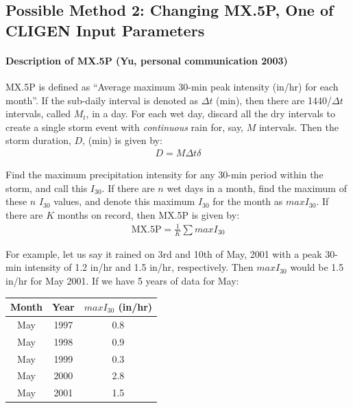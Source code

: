 \subsection{Possible Method 2: Changing {MX.5P}, One of CLIGEN Input
Parameters}
\label{sec:MethodTwo}

\paragraph{Description of {MX.5P} (Yu, personal communication 2003)}
\label{sec:MX5PByBYu}

{MX.5P} is defined as ``Average maximum 30-min peak intensity (in/hr) for each
month''. If the sub-daily interval is denoted as $\Delta t$ (min), then there
are 1440/$\Delta t$ intervals, called $M_t$, in a day. For each wet day, discard
all the dry intervals to create a single storm event with \emph{continuous} rain
for, say, $M$ intervals. Then the storm duration, $D$, (min) is given by:
\begin{eqnarray}
  D = M \Delta t \delta
\end{eqnarray}

Find the maximum precipitation intensity for any 30-min period within the storm,
and call this $I_{30}$. If there are $n$ wet days in a month, find the maximum
of these $n$ $I_{30}$ values, and denote this maximum $I_{30}$ for the month as
$maxI_{30}$. If there are $K$ months on record, then {MX.5P} is given by:
\begin{eqnarray}
  \mathrm{MX.5P} = \frac{1}{K} \sum maxI_{30}
\end{eqnarray}

For example, let us say it rained on 3rd and 10th of May, 2001 with a peak
30-min intensity of 1.2 in/hr and 1.5 in/hr, respectively. Then $maxI_{30}$
would be 1.5 in/hr for May 2001. If we have 5 years of data for May:

\begin{table}[hbpt]
  \centering
  \begin{tabular}{ccc}
    \toprule
    Month & Year & $maxI_{30}$ (in/hr)\\
    \midrule
    May & 1997 & 0.8\\
    May & 1998 & 0.9\\
    May & 1999 & 0.3\\
    May & 2000 & 2.8\\
    May & 2001 & 1.5\\
    \bottomrule
  \end{tabular}
\end{table}

